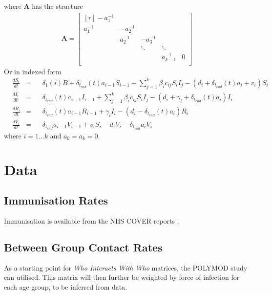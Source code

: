 \documentclass{article}
\theoremstyle{definition}
\begin{document}
  where $\mathbf{A}$ has the structure
\begin{gather*}
\mathbf{A}=\begin{bmatrix}[r]
-a_1^{-1} &           &           &              &   \\
 a_1^{-1} & -a_2^{-1} &           &              &   \\
          &  a_2^{-1} & -a_3^{-1} &              &   \\
          &           & \ddots    & \ddots       &   \\
          &           &		        & a_{k-1}^{-1} & 0 \\
\end{bmatrix}
\end{gather*}
Or in indexed form
\begin{align*}
  &\frac{dS_{i}}{dt}&=&&\delta_1(i)B + \delta_{t_{end}}(t)a_{i-1}S_{i-1}-\sum_{j=1}^{k}\beta_{i}c_{ij}S_{i}I_{j}-(d_{i} + \delta_{t_{end}}(t)a_{i} + v_{i})S_{i}\\
  &\frac{dI_{i}}{dt} &=&&\delta_{t_{end}}(t)a_{i-1}I_{i-1}+\sum_{j=1}^{k}\beta_{i}c_{ij}S_{i}I_{j}-(d_{i}+\gamma_{i}+\delta_{t_{end}}(t)a_{i})I_{i}\\
  &\frac{dR_{i}}{dt} &=&& \delta_{t_{end}}(t)a_{i-1}R_{i-1}+\gamma_{i}I_{i}-(d_{i}-\delta_{t_{end}}(t)a_{i})R_{i}\\
  &\frac{dV_{i}}{dt} &=&& \delta_{t_{end}}a_{i-1}V_{i-1}+v_iS_i-d_{i}V_{i}-\delta_{t_{end}}a_{i}V_{i}
\end{align*}
where $i=1...k$ and $a_0 = a_k = 0$.
\section{Data}
\subsection{Immunisation Rates}
Immunisation is available from the NHS COVER reports \cite{noauthor_childhood_nodate}.
\subsection{Between Group Contact Rates}
As a starting point for \emph{Who Interacts With Who} matrices, the POLYMOD study \cite{mossong_social_2008} can utilised. This matrix will then further be weighted by force of infection for each age group, to be inferred from data.
\end{document}
